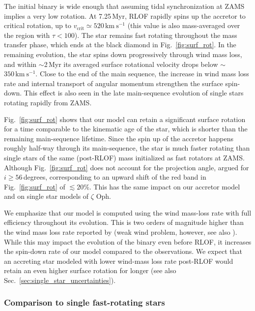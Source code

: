 \documentclass[twocolumn,twocolappendix,trackchanges]{aastex63}
\newcommand{\kms}{{\mathrm{km\ s^{-1}}}}
\DeclareRobustCommand{\Figref}[1]{Fig.~\ref{#1}}
\DeclareRobustCommand{\Secref}[1]{Sec.~\ref{#1}}
\newcommand{\zoph}{$\zeta$ Oph}
\begin{document}
The initial binary is wide enough that assuming tidal synchronization
at ZAMS implies a very low rotation. At 7.25\,Myr, RLOF rapidly spins
up the accretor to critical rotation, up to
$v_\mathrm{crit}\simeq520\,\kms$ (this value is also mass-averaged
over the region with $\tau<100$). The star remains fast rotating
throughout the mass transfer phase, which ends at the black diamond in
\Figref{fig:surf_rot}. In the remaining evolution, the star spins down
progressively through wind mass loss, and within $\sim$2\,Myr its
averaged surface rotational velocity drops below
$\sim$$350\,\kms$. Close to the end of the main sequence, the increase in wind mass loss rate and internal transport of angular momentum strengthen the surface spin-down. This effect is also seen in the late main-sequence evolution of single stars rotating rapidly from ZAMS.

\Figref{fig:surf_rot} shows that our model can retain a significant surface rotation for a time comparable to the kinematic age of the star, which is shorter than the remaining main-sequence lifetime. Since the spin up of the accretor happens roughly half-way through its main-sequence, the star is much faster rotating than single stars of the same (post-RLOF) mass initialized as fast rotators at ZAMS. Although \Figref{fig:surf_rot} does not account for the projection angle, \cite{zehe:18} argued for
$i\geq56$\,degrees, corresponding to an upward shift of the red band in \Figref{fig:surf_rot} of $\lesssim
20\%$. This has the same impact on our accretor model and on single star models of \zoph.

We emphasize that our model is computed using the \cite{vink:00,
  vink:01} wind mass-loss rate with full efficiency throughout its
evolution. This is two orders of magnitude higher than the wind mass
loss rate reported by \cite{marcolino:09} (weak wind problem,
however, see also \citealt{lucy:12, lagae:21}). While this may impact
the evolution of the binary even before RLOF, it increases the
spin-down rate of our model compared to the observations. We expect
that an accreting star modeled with lower wind-mass loss rate
post-RLOF would retain an even higher surface rotation for longer (see
also \Secref{sec:single_star_uncertainties}).


\subsubsection{Comparison to single fast-rotating stars}
\end{document}
